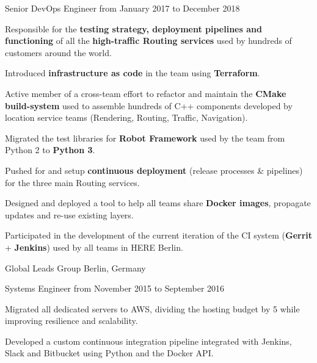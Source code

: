 \documentclass[10pt, a4paper]{awesome-cv}
\begin{document}
\begin{cventries}
	\vspace{2pt}
	\cventry
	{Senior DevOps Engineer}
	{from January 2017 to December 2018}
	{
		\begin{cvitems}
			\item {Responsible for the \textbf{testing strategy, deployment pipelines and functioning} of all the \textbf{high-traffic Routing services} used by hundreds of customers around the world.}
			\item {Introduced \textbf{infrastructure as code} in the team using \textbf{Terraform}.}
			\item {Active member of a cross-team effort to refactor and maintain the \textbf{CMake build-system} used to assemble hundreds of C++ components developed by location service teams (Rendering, Routing, Traffic, Navigation).}
			\item {Migrated the test libraries for \textbf{Robot Framework} used by the team from Python 2 to \textbf{Python 3}.}
			\item {Pushed for and setup \textbf{continuous deployment} (release processes \& pipelines) for the three main Routing services.}
			\item {Designed and deployed a tool to help all teams share \textbf{Docker images}, propagate updates and re-use existing layers.}
			\item {Participated in the development of the current iteration of the CI system (\textbf{Gerrit} + \textbf{Jenkins}) used by all teams in HERE Berlin.}
		\end{cvitems}
	}
\end{cventries}

\begin{cventries}

	\cventrytitle
	{Global Leads Group}
	{Berlin, Germany}

	\cventry
	{Systems Engineer}
	{from November 2015 to September 2016}
	{
		\begin{cvitems}
			\item {Migrated all dedicated servers to AWS, dividing the hosting budget by 5 while improving resilience and scalability.}
			\item {Developed a custom continuous integration pipeline integrated with Jenkins, Slack and Bitbucket using Python and the Docker API.}
		\end{cvitems}
	}

\end{cventries}
\end{document}
